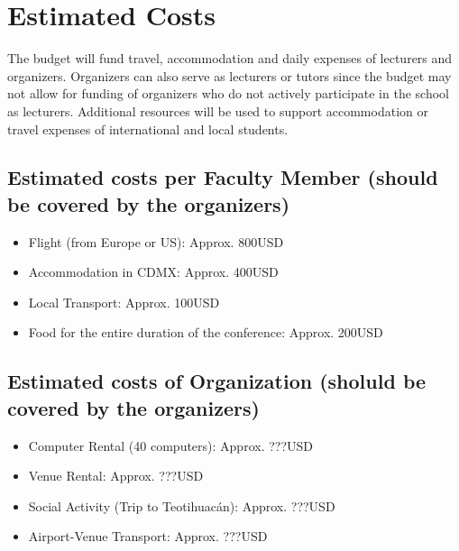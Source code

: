 \documentclass{article}[11pt]
\begin{document}



\section*{Estimated Costs}
The budget will fund travel, accommodation and daily expenses of lecturers and organizers. Organizers can also serve as lecturers or tutors since the budget may not allow for funding of organizers who do not actively participate in the school as lecturers. Additional resources will be used to support accommodation or travel expenses of international and local students.

\subsection*{Estimated costs per Faculty Member (should be covered by the organizers)}
\begin{itemize}
    \item Flight (from Europe or US): Approx. 800USD 
    \item Accommodation in CDMX: Approx. 400USD
    \item Local Transport: Approx. 100USD
    \item Food for the entire duration of the conference: Approx. 200USD
\end{itemize}

\pagebreak
\subsection*{Estimated costs of Organization (sholuld be covered by the organizers)}
\begin{itemize}
  \item Computer Rental (40 computers): Approx. ???USD
  \item Venue Rental: Approx. ???USD
  \item Social Activity (Trip to Teotihuac\'an): Approx. ???USD
  \item Airport-Venue Transport: Approx. ???USD
\end{itemize}
\end{document}
